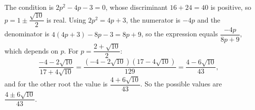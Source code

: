 The condition is $2p^2-4p-3=0$, whose discriminant $16+24=40$ is positive, so $p=1\pm\dfrac{\sqrt{10}}{2}$ is real. Using $2p^2=4p+3$, the numerator is $-4p$ and the denominator is $4(4p+3)-8p-3=8p+9$, so the expression equals $\dfrac{-4p}{8p+9}$, which depends on $p$. For $p=\dfrac{2+\sqrt{10}}{2}$:
\[\dfrac{-4-2\sqrt{10}}{17+4\sqrt{10}}=\dfrac{(-4-2\sqrt{10})(17-4\sqrt{10})}{129}=\dfrac{4-6\sqrt{10}}{43},\]
and for the other root the value is $\dfrac{4+6\sqrt{10}}{43}$. So the possible values are $\boxed{\dfrac{4\pm6\sqrt{10}}{43}}$.
